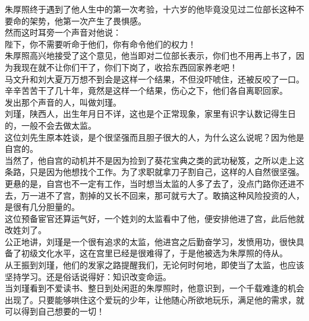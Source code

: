 \begin{multicols}{\theparacolNo}
朱厚照终于遇到了他人生中的第一次考验，十六岁的他毕竟没见过二位部长这种不要命的架势，他第一次产生了畏惧感。\\

然而这时耳旁一个声音对他说：\\

陛下，你不需要听命于他们，你有命令他们的权力！\\

朱厚照高兴地接受了这个意见，他当即对二位部长表示，你们也不用再上书了，因为我现在就不让你们干了，你们下岗了，收拾东西回家养老吧！\\

马文升和刘大夏万万想不到会是这样一个结果，不但没吓唬住，还被反咬了一口。辛辛苦苦干了几十年，竟然是这样一个结果，伤心之下，他们各自离职回家。\\

发出那个声音的人，叫做刘瑾。\\

刘瑾，陕西人，出生年月日不详，这也是个正常现象，家里有识字认数记得生日的，一般不会去做太监。\\

这位刘先生原本姓谈，是个很坚强而且胆子很大的人，为什么这么说呢？因为他是自宫的。\\

当然了，他自宫的动机并不是因为捡到了葵花宝典之类的武功秘笈，之所以走上这条路，只是因为他想找个工作。为了求职就拿刀子割自己，这样的人自然很坚强。\\

更悬的是，自宫也不一定有工作，当时想当太监的人多了去了，没点门路你还进不去，万一进不了宫，割掉的又长不回来，那可就亏大了。敢搞这种风险投资的人，是很有几分胆量的。\\

这位预备宦官还算运气好，一个姓刘的太监看中了他，便安排他进了宫，此后他就改姓刘了。\\

公正地讲，刘瑾是一个很有追求的太监，他进宫之后勤奋学习，发愤用功，很快具备了初级文化水平，这在宫里已经是很难得了，于是他被选为朱厚照的侍从。\\

从王振到刘瑾，他们的发家之路提醒我们，无论何时何地，即使当了太监，也应该坚持学习。还是俗话说得好：知识改变命运。\\

当刘瑾看到不爱读书、整日到处闲逛的朱厚照时，他意识到，一个千载难逢的机会出现了。只要能够哄住这个爱玩的少年，让他随心所欲地玩乐，满足他的需求，就可以得到自己想要的一切！\\


\end{multicols}

